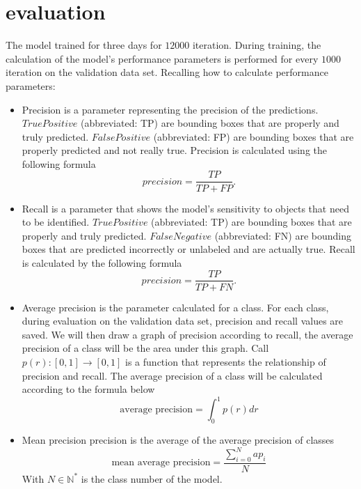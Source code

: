 \documentclass[conference]{IEEEtran}
\begin{document}
\section{evaluation}
The model trained for three days for $ 12000 $ iteration. During training, the calculation of the model's performance parameters is performed for every $ 1000 $ iteration on the validation data set.
Recalling how to calculate performance parameters:
\begin{itemize}
	\item Precision is a parameter representing the precision of the predictions. $ True Positive $ (abbreviated: TP) are bounding boxes that are properly and truly predicted. $ False Positive $ (abbreviated: FP) are bounding boxes that are properly predicted and not really true. Precision is calculated using the following formula
	\begin{equation}
		precision = \frac{TP}{TP+FP}.
	\end{equation}
	\item Recall is a parameter that shows the model's sensitivity to objects that need to be identified. $ True Positive $ (abbreviated: TP) are bounding boxes that are properly and truly predicted. $ False Negative $ (abbreviated: FN) are bounding boxes that are predicted incorrectly or unlabeled and are actually true. Recall is calculated by the following formula
	\begin{equation}
		precision = \frac{TP}{TP+FN}.
	\end{equation}
	\item Average precision is the parameter calculated for a class. For each class, during evaluation on the validation data set, precision and recall values are saved. We will then draw a graph of precision according to recall, the average precision of a class will be the area under this graph. Call $ p (r): [0,1] \rightarrow [0,1] $ is a function that represents the relationship of precision and recall. The average precision of a class will be calculated according to the formula below
	\begin{equation}
		\text{average precision} = \int_{0}^{1} p(r) dr
	\end{equation}
	\item Mean precision precision is the average of the average precision of classes
	\begin{equation}
		\text{mean average precision} = \frac{\sum_{i=0}^{N} ap_i}{N}
	\end{equation}
	With $N \in \mathbb{N}^*$ is the class number of the model.
\end{itemize}
\end{document}
